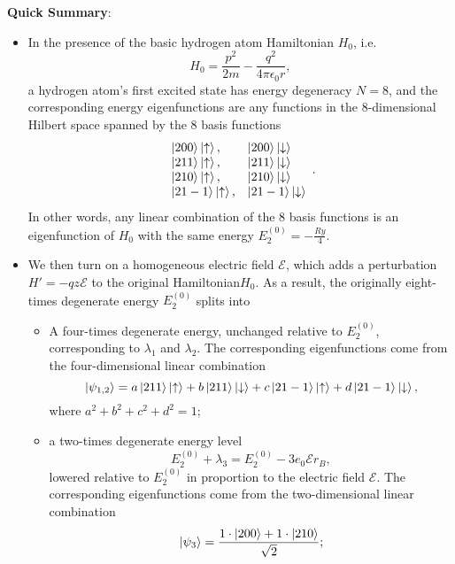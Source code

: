 \documentclass[11pt, a4paper]{article}
\newcommand{\Ham}{Hamiltonian\xspace}
\newcommand{\p}{\psi}  %
\newcommand{\E}{\mathcal{E}}  %
\newcommand{\ua}{\uparrow}  %
\newcommand{\da}{\downarrow}  %
\begin{document}
	
\textbf{Quick Summary}: 
\begin{itemize}
	\item In the presence of the basic hydrogen atom Hamiltonian $ H_{0} $, i.e.
	\begin{equation*}
		H_{0} = \frac{p^{2}}{2m} - \frac{q^{2}}{4\pi \epsilon_{0}r},
	\end{equation*}
	a hydrogen atom's first excited state has energy degeneracy $ N = 8 $, and the corresponding energy eigenfunctions are any functions in the  $ 8 $-dimensional Hilbert space spanned by the 8 basis functions
	\[
	\begin{array}{ll}
		\ket{200}\ket{\ua}, & \ket{200}\ket{\da}\\
		\ket{211}\ket{\ua}, & \ket{211}\ket{\da}\\
		\ket{210}\ket{\ua}, & \ket{210}\ket{\da}\\
		\ket{21-1}\ket{\ua}, & \ket{21-1}\ket{\da}
	\end{array}.
	\]
	In other words, any linear combination of the 8 basis functions is an eigenfunction of $ H_{0} $ with the  same energy $ E^{(0)}_{2} = -\frac{\si{Ry}}{4} $.
	
	\item We then turn on a homogeneous electric field $ \E $, which adds a perturbation $ H' = -qz\E $ to the original \Ham $ H_{0} $. As a result, the originally eight-times degenerate energy $ E^{(0)}_{2} $ splits into
	\begin{itemize}
		\item  A four-times degenerate energy, unchanged relative to $ E^{(0)}_{2} $, corresponding to $ \lambda_{1} $ and $ \lambda_{2} $. The corresponding eigenfunctions come from the four-dimensional linear combination 
		\begin{equation*}
			\ket{\p_{1,2}} = a \ket{211}\ket{\ua} + b \ket{211}\ket{\da} + c \ket{21-1}\ket{\ua} + d \ket{21-1}\ket{\da},
		\end{equation*}
		where $ a^{2} + b^{2} + c^{2} + d^{2} = 1 $; 
		
		\item a two-times degenerate energy level
		\begin{equation*}
			E^{(0)}_{2} + \lambda_{3} = E^{(0)}_{2} - 3 e_{0}\E r_{B},
		\end{equation*}
		lowered relative to $ E^{(0)}_{2} $ in proportion to the electric field $ \E $. The corresponding eigenfunctions come from the two-dimensional linear combination
		\begin{equation*}
			\ket{\p_{3}} = \frac{1\cdot \ket{200} + 1\cdot \ket{210}}{\sqrt{2}};
		\end{equation*}
			

\end{itemize}
\end{itemize}
\end{document}
